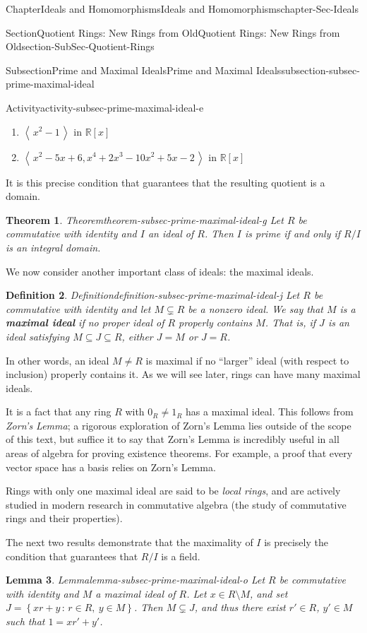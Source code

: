 \documentclass[oneside,10pt,]{book}
\newcommand{\terminology}[1]{\textbf{#1}}
\numberwithin{equation}{section}
\newcommand{\ideal}[1]{\left\langle\, #1 \,\right\rangle}
\newcommand{\setof}[2]{{\left\{#1\,\colon\,#2\right\}}}
\def\R{{\mathbb R}}
\newtheorem{theorem}{Theorem}[section]
\newtheorem{lemma}[theorem]{Lemma}
\newtheorem{definition}[theorem]{Definition}
\begin{document}
\begin{chapterptx}{Chapter}{Ideals and Homomorphisms}{}{Ideals and Homomorphisms}{}{}{chapter-Sec-Ideals}
\begin{sectionptx}{Section}{Quotient Rings: New Rings from Old}{}{Quotient Rings: New Rings from Old}{}{}{section-SubSec-Quotient-Rings}
\begin{subsectionptx}{Subsection}{Prime and Maximal Ideals}{}{Prime and Maximal Ideals}{}{}{subsection-subsec-prime-maximal-ideal}
\begin{activity}{Activity}{}{activity-subsec-prime-maximal-ideal-e}
\begin{enumerate}
\item{}\(\ideal{x^2-1}\) in \(\R[x]\)%
\item{}\(\ideal{x^2-5x+6, x^4+2x^3-10x^2+5x-2}\) in \(\R[x]\)%
\end{enumerate}
%
\end{activity}%
It is this precise condition that guarantees that the resulting quotient is a domain.%
\begin{theorem}{Theorem}{}{}{theorem-subsec-prime-maximal-ideal-g}%
Let \(R\) be commutative with identity and \(I\) an ideal of \(R\). Then \(I\) is prime if and only if \(R/I\) is an integral domain.%
\end{theorem}
We now consider another important class of ideals: the maximal ideals.%
\begin{definition}{Definition}{}{definition-subsec-prime-maximal-ideal-j}%
%
%
Let \(R\) be commutative with identity and let \(M\subsetneq R\) be a nonzero ideal. We say that \(M\) is a \terminology{maximal ideal} if no proper ideal of \(R\) properly contains \(M\). That is, if \(J\) is an ideal satisfying \(M\subseteq J\subseteq R\), either \(J=M\) or \(J=R\).%
\end{definition}
In other words, an ideal \(M\ne R\) is maximal if no ``larger'' ideal (with respect to inclusion) properly contains it. As we will see later, rings can have many maximal ideals.%
\par
It is a fact that any ring \(R\) with \(0_R\ne 1_R\) has a maximal ideal. This follows from \emph{Zorn's Lemma}; a rigorous exploration of Zorn's Lemma lies outside of the scope of this text, but suffice it to say that Zorn's Lemma is incredibly useful in all areas of algebra for proving existence theorems. For example, a proof that every vector space has a basis relies on Zorn's Lemma.%
\par
Rings with only one maximal ideal are said to be \emph{local rings}, and are actively studied in modern research in commutative algebra (the study of commutative rings and their properties).%
\par
The next two results demonstrate that the maximality of \(I\) is precisely the condition that guarantees that \(R/I\) is a field.%
\begin{lemma}{Lemma}{}{}{lemma-subsec-prime-maximal-ideal-o}%
Let \(R\) be commutative with identity and \(M\) a maximal ideal of \(R\). Let \(x\in R\setminus M\), and set \(J = \setof{xr+y}{r\in R, \ y\in M}\). Then \(M\subsetneq J\), and thus there exist \(r'\in R\), \(y'\in M\) such that \(1 = xr'+y'\).%

\end{lemma}
\end{subsectionptx}
\end{sectionptx}
\end{chapterptx}
\end{document}

